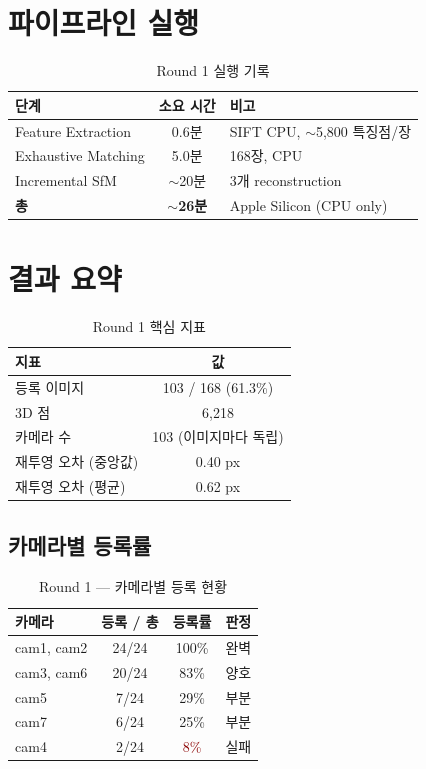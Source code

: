 \documentclass[11pt, a4paper]{report}
\begin{document}
\section{파이프라인 실행}

\begin{table}[H]
\centering
\caption{Round 1 실행 기록}
\renewcommand{\arraystretch}{1.3}
\begin{tabular}{lcl}
\toprule
\textbf{단계} & \textbf{소요 시간} & \textbf{비고} \\
\midrule
Feature Extraction & 0.6분 & SIFT CPU, $\sim$5,800 특징점/장 \\
Exhaustive Matching & 5.0분 & 168장, CPU \\
Incremental SfM & $\sim$20분 & 3개 reconstruction \\
\midrule
\textbf{총} & \textbf{$\sim$26분} & Apple Silicon (CPU only) \\
\bottomrule
\end{tabular}
\end{table}

\section{결과 요약}

\begin{table}[H]
\centering
\caption{Round 1 핵심 지표}
\renewcommand{\arraystretch}{1.3}
\begin{tabular}{lc}
\toprule
\textbf{지표} & \textbf{값} \\
\midrule
등록 이미지 & 103 / 168 (\textcolor{noteorange}{61.3\%}) \\
3D 점 & 6,218 \\
카메라 수 & 103 (이미지마다 독립) \\
재투영 오차 (중앙값) & 0.40 px \\
재투영 오차 (평균) & 0.62 px \\
\bottomrule
\end{tabular}
\end{table}

\subsection{카메라별 등록률}

\begin{table}[H]
\centering
\caption{Round 1 --- 카메라별 등록 현황}
\renewcommand{\arraystretch}{1.3}
\begin{tabular}{lccl}
\toprule
\textbf{카메라} & \textbf{등록 / 총} & \textbf{등록률} & \textbf{판정} \\
\midrule
cam1, cam2 & 24/24 & \textcolor{thmgreen}{100\%} & 완벽 \\
cam3, cam6 & 20/24 & \textcolor{thmgreen}{83\%} & 양호 \\
cam5 & 7/24 & \textcolor{noteorange}{29\%} & 부분 \\
cam7 & 6/24 & \textcolor{noteorange}{25\%} & 부분 \\
cam4 & 2/24 & \textcolor{darkred}{8\%} & 실패 \\
\bottomrule
\end{tabular}
\end{table}
\end{document}
